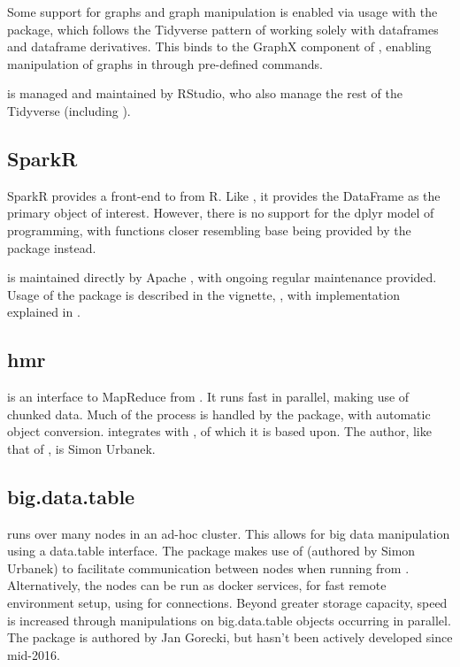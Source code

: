 Some support for graphs and graph manipulation is enabled via usage with
the  package, which follows the Tidyverse pattern of
working solely with dataframes and dataframe derivatives\cite{kuo18}.
This binds to the GraphX component of , enabling manipulation of
graphs in  through pre-defined commands.

 is managed and maintained by RStudio, who also manage the rest
of the Tidyverse (including ).

\subsection{SparkR}\label{subsec:sparkr}

SparkR provides a front-end to  from
R\cite{venkataraman20:_spark}. Like , it provides the DataFrame
as the primary object of interest. However, there is no support for the
dplyr model of programming, with functions closer resembling base \R{}
being provided by the package instead.

 is maintained directly by Apache , with ongoing regular
maintenance provided. Usage of the package is described in the vignette,
\textcite{venktaraman19:spark-pract-guide}, with implementation
explained in \cite{venkataraman2016sparkr}.

\subsection{hmr}\label{subsec:hmr}

 is an interface to MapReduce from \R{}\cite{urbanek20}. It runs
fast in parallel, making use of chunked data. Much of the process is handled by the
package, with automatic \R{} object conversion.  integrates with
, of which it is based upon. The author, like that of , is
Simon Urbanek.

\subsection{big.data.table}\label{subsec:big.data.table}

 runs  over many nodes in an ad-hoc
cluster\cite{gorecki16}. This allows for big data manipulation using a
data.table interface. The package makes use of  (authored by Simon
Urbanek) to facilitate communication between nodes when running from \R{}.
Alternatively, the nodes can be run as docker services, for fast remote
environment setup, using  for connections. Beyond greater
storage capacity, speed is increased through manipulations on
big.data.table objects occurring in parallel. The package is authored by Jan
Gorecki, but hasn't been actively developed since mid-2016.
